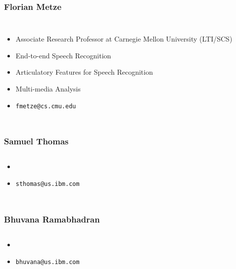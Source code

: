 \begin{frame}
  \frametitle{Florian Metze}
  \begin{columns}[T]
    \column{2in}
    \begin{itemize}
    \item Associate Research Professor at Carnegie Mellon University (LTI/SCS)
    \item End-to-end Speech Recognition
    \item Articulatory Features for Speech Recognition
    \item Multi-media Analysis
    \item \texttt{fmetze@cs.cmu.edu}
    \end{itemize}
    \column{2in}
  \end{columns}
\end{frame}

\begin{frame}
  \frametitle{Samuel Thomas}
  \begin{columns}[T]
    \column{2in}
    \begin{itemize}
    \item 
    \item \texttt{sthomas@us.ibm.com}
    \end{itemize}
    \column{2in}
  \end{columns}
\end{frame}

\begin{frame}
  \frametitle{Bhuvana Ramabhadran}
  \begin{columns}[T]
    \column{2in}
    \begin{itemize}
    \item 
    \item \texttt{bhuvana@us.ibm.com}
    \end{itemize}
    \column{2in}
  \end{columns}
\end{frame}

